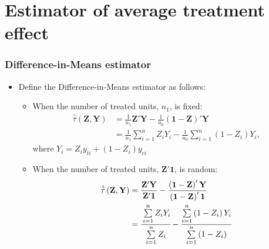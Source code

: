 \documentclass[table, xcolor={dvipsnames}, 9pt]{beamer}
\theoremstyle{newstyle}
\begin{document}
\section{Estimator of average treatment effect}
\begin{frame}
\frametitle{Difference-in-Means estimator} 
\begin{itemize}
\item Define the Difference-in-Means estimator as follows: 
\begin{itemize}
\item When the number of treated units, $n_1$, is fixed:
\begin{align*}
\hat{\bar{\tau}}\left(\mathbf{Z}, \mathbf{Y}\right) & = \frac{1}{n_1}\mathbf{Z}'\mathbf{Y} - \frac{1}{n_0}\left(\mathbf{1} - \mathbf{Z}\right)'\mathbf{Y} \\ 
& = \frac{1}{n_1}\sum \limits_{i = 1}^n Z_i Y_i - \frac{1}{n_0}\sum \limits_{i = 1}^n \left(1 - Z_i\right) Y_i,
\end{align*}
where $Y_i = Z_i y_{ti} + \left(1 - Z_i\right)y_{ci}$
\item When the number of treated units, $\mathbf{Z}'\mathbf{1}$, is random:
\begin{align*}
\hat{\bar{\tau}}\left(\mathbf{Z}, \mathbf{Y}\right) & = \frac{\mathbf{Z}'\mathbf{Y}}{\mathbf{Z}'\mathbf{1}} - \frac{\left(\mathbf{1} - \mathbf{Z}\right)'\mathbf{Y}}{\left(\mathbf{1} - \mathbf{Z}\right)'\mathbf{1}} \\ 
& = \cfrac{\sum \limits_{i = 1}^n Z_i Y_i}{\sum\limits_{i = 1}^n Z_i} - \frac{\sum \limits_{i = 1}^n \left(1 - Z_i\right) Y_i}{\sum \limits_{i = 1}^n \left(1 - Z_i\right)}
\end{align*}
\end{itemize}
\end{itemize}
\end{frame}
\end{document}
